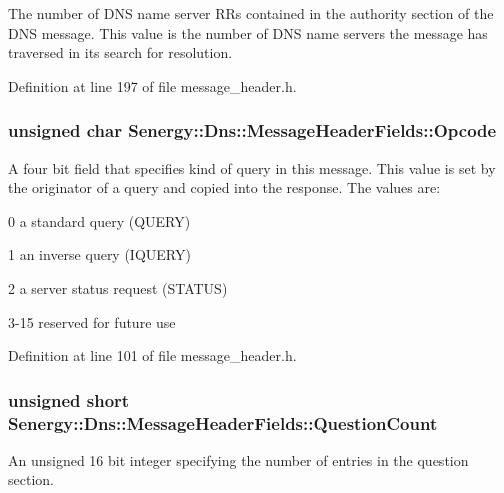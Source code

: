 The number of D\-N\-S name server R\-Rs contained in the authority section of the D\-N\-S message. This value is the number of D\-N\-S name servers the message has traversed in its search for resolution. 



Definition at line 197 of file message\-\_\-header.\-h.

\hypertarget{struct_senergy_1_1_dns_1_1_message_header_fields_ac2d7ba4468405e5693f07d4321058be0}{
\subsubsection[{Opcode}]{\setlength{\rightskip}{0pt plus 5cm}unsigned char Senergy\-::\-Dns\-::\-Message\-Header\-Fields\-::\-Opcode}}\label{struct_senergy_1_1_dns_1_1_message_header_fields_ac2d7ba4468405e5693f07d4321058be0}


A four bit field that specifies kind of query in this message. This value is set by the originator of a query and copied into the response. The values are\-: 

0 a standard query (Q\-U\-E\-R\-Y)

1 an inverse query (I\-Q\-U\-E\-R\-Y)

2 a server status request (S\-T\-A\-T\-U\-S)

3-\/15 reserved for future use 

Definition at line 101 of file message\-\_\-header.\-h.

\hypertarget{struct_senergy_1_1_dns_1_1_message_header_fields_a8af9bbfa134c9e0d4fc846103f7b72ad}{
\subsubsection[{Question\-Count}]{\setlength{\rightskip}{0pt plus 5cm}unsigned short Senergy\-::\-Dns\-::\-Message\-Header\-Fields\-::\-Question\-Count}}\label{struct_senergy_1_1_dns_1_1_message_header_fields_a8af9bbfa134c9e0d4fc846103f7b72ad}


An unsigned 16 bit integer specifying the number of entries in the question section. 



